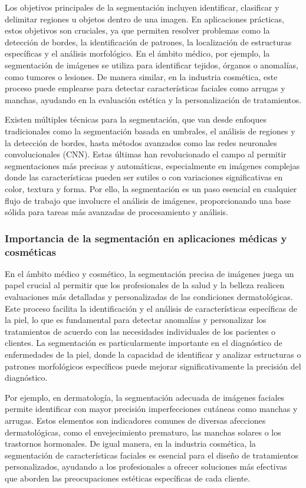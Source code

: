 Los objetivos principales de la segmentación incluyen identificar, clasificar y delimitar regiones u objetos dentro de una imagen. En aplicaciones prácticas, estos objetivos son cruciales, ya que permiten resolver problemas como la detección de bordes, la identificación de patrones, la localización de estructuras específicas y el análisis morfológico. En el ámbito médico, por ejemplo, la segmentación de imágenes se utiliza para identificar tejidos, órganos o anomalías, como tumores o lesiones. De manera similar, en la industria cosmética, este proceso puede emplearse para detectar características faciales como arrugas y manchas, ayudando en la evaluación estética y la personalización de tratamientos. \parencite{gonzalez2018}

Existen múltiples técnicas para la segmentación, que van desde enfoques tradicionales como la segmentación basada en umbrales, el análisis de regiones y la detección de bordes, hasta métodos avanzados como las redes neuronales convolucionales (CNN). Estas últimas han revolucionado el campo al permitir segmentaciones más precisas y automáticas, especialmente en imágenes complejas donde las características pueden ser sutiles o con variaciones significativas en color, textura y forma. Por ello, la segmentación es un paso esencial en cualquier flujo de trabajo que involucre el análisis de imágenes, proporcionando una base sólida para tareas más avanzadas de procesamiento y análisis. \parencite{gonzalez2018}
\subsubsection{Importancia de la segmentación en aplicaciones médicas y cosméticas}
En el ámbito médico y cosmético, la segmentación precisa de imágenes juega un papel crucial al permitir que los profesionales de la salud y la belleza realicen evaluaciones más detalladas y personalizadas de las condiciones dermatológicas. Este proceso facilita la identificación y el análisis de características específicas de la piel, lo que es fundamental para detectar anomalías y personalizar los tratamientos de acuerdo con las necesidades individuales de los pacientes o clientes. La segmentación es particularmente importante en el diagnóstico de enfermedades de la piel, donde la capacidad de identificar y analizar estructuras o patrones morfológicos específicos puede mejorar significativamente la precisión del diagnóstico. \parencite{mohammadi2019}

Por ejemplo, en dermatología, la segmentación adecuada de imágenes faciales permite identificar con mayor precisión imperfecciones cutáneas como manchas y arrugas. Estos elementos son indicadores comunes de diversas afecciones dermatológicas, como el envejecimiento prematuro, las manchas solares o los trastornos hormonales. De igual manera, en la industria cosmética, la segmentación de características faciales es esencial para el diseño de tratamientos personalizados, ayudando a los profesionales a ofrecer soluciones más efectivas que aborden las preocupaciones estéticas específicas de cada cliente. \parencite{gonzalez2018}

